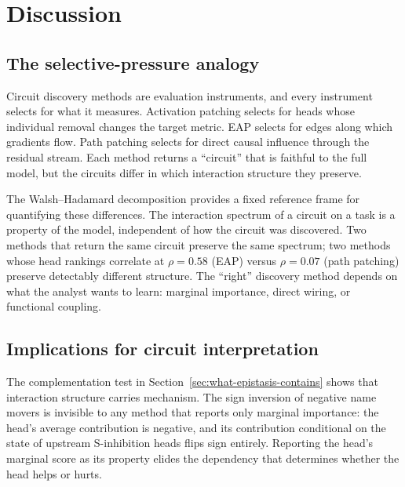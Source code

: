 %

\section{Discussion}
\label{sec:discussion}

\subsection{The selective-pressure analogy}

Circuit discovery methods are evaluation instruments, and every
instrument selects for what it measures. Activation patching selects for
heads whose individual removal changes the target metric. EAP selects
for edges along which gradients flow. Path patching selects for direct
causal influence through the residual stream. Each method returns a
``circuit'' that is faithful to the full model, but the circuits differ
in which interaction structure they preserve.

The Walsh--Hadamard decomposition provides a fixed reference frame for
quantifying these differences. The interaction spectrum of a circuit on
a task is a property of the model, independent of how the circuit was
discovered. Two methods that return the same circuit preserve the same
spectrum; two methods whose head rankings correlate at $\rho = 0.58$
(EAP) versus $\rho = 0.07$ (path patching) preserve detectably
different structure. The ``right'' discovery method depends on what
the analyst wants to learn: marginal importance, direct wiring, or
functional coupling.

\subsection{Implications for circuit interpretation}

The complementation test in
Section~\ref{sec:what-epistasis-contains} shows that interaction
structure carries mechanism. The sign inversion of negative name movers
is invisible to any method that reports only marginal importance: the
head's average contribution is negative, and its contribution
conditional on the state of upstream S-inhibition heads flips sign
entirely. Reporting the head's marginal score as its property elides
the dependency that determines whether the head helps or hurts.

